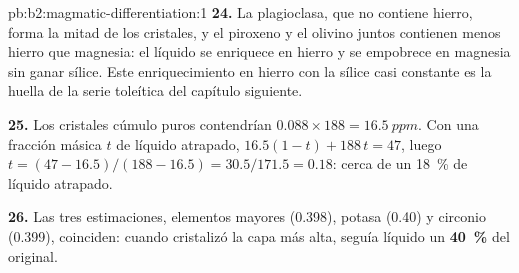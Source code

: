 \begin{solution}{pb:b2:magmatic-differentiation:1}
\textbf{24.} La plagioclasa, que no contiene hierro, forma la mitad de los cristales, y el
piroxeno y el olivino juntos contienen menos hierro que magnesia: el líquido
se enriquece en hierro y se empobrece en magnesia sin ganar sílice. Este enriquecimiento
en hierro con la sílice casi constante es la huella de la serie toleítica del
capítulo siguiente.

\textbf{25.} Los cristales cúmulo puros contendrían $0.088\times188 = \qty{16.5}{ppm}$. Con una
fracción másica $t$ de líquido atrapado, $16.5(1 - t) + 188\,t = 47$, luego $t = (47 -
16.5)/(188 - 16.5) = 30.5/171.5 = 0.18$: cerca de un \qty{18}{\percent} de líquido atrapado.

\textbf{26.} Las tres estimaciones, elementos mayores (0.398), potasa (0.40) y
circonio (0.399), coinciden: cuando cristalizó la capa más alta, seguía líquido un
\textbf{\qty[text-series-to-math=true]{40}{\percent}} del 
original.
\end{solution}

